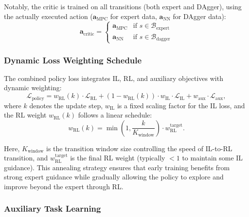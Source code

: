 Notably, the critic is trained on all transitions (both expert and DAgger), using the actually executed action ($\mathbf{a}_{\text{MPC}}$ for expert data, $\mathbf{a}_{\text{NN}}$ for DAgger data):
\begin{equation}
\mathbf{a}_{\text{critic}} = \begin{cases}
\mathbf{a}_{\text{MPC}} & \text{if } s \in \mathcal{B}_{\text{expert}} \\
\mathbf{a}_{\text{NN}} & \text{if } s \in \mathcal{B}_{\text{dagger}}
\end{cases}
\end{equation}

\subsubsection{Dynamic Loss Weighting Schedule}

The combined policy loss integrates IL, RL, and auxiliary objectives with dynamic weighting:
\begin{equation}
\mathcal{L}_{\text{policy}} = w_{\text{RL}}(k) \cdot \mathcal{L}_{\text{RL}} + (1 - w_{\text{RL}}(k)) \cdot w_{\text{IL}} \cdot \mathcal{L}_{\text{IL}} + w_{\text{aux}} \cdot \mathcal{L}_{\text{aux}},
\label{eq:dynamic_loss}
\end{equation}
where $k$ denotes the update step, $w_{\text{IL}}$ is a fixed scaling factor for the IL loss, and the RL weight $w_{\text{RL}}(k)$ follows a linear schedule:
\begin{equation}
w_{\text{RL}}(k) = \min\left(1, \frac{k}{K_{\text{window}}}\right) \cdot w_{\text{RL}}^{\text{target}}.
\label{eq:weight_schedule}
\end{equation}

Here, $K_{\text{window}}$ is the transition window size controlling the speed of IL-to-RL transition, and $w_{\text{RL}}^{\text{target}}$ is the final RL weight (typically $< 1$ to maintain some IL guidance). This annealing strategy ensures that early training benefits from strong expert guidance while gradually allowing the policy to explore and improve beyond the expert through RL.

\subsubsection{Auxiliary Task Learning}

